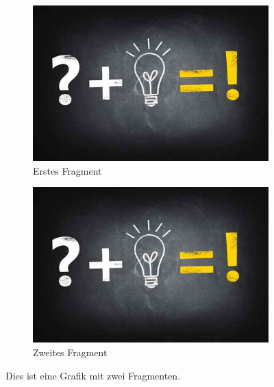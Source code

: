 \begin{figure}[!ht]
	\centering
	\begin{subfigure}{.45\textwidth} %
		\includegraphics[width=\textwidth]{images/test.jpg} %
		\caption{Erstes Fragment}
		\label{spielwiese:fragment1}
	\end{subfigure}
	\hspace{.05\textwidth} %
	\begin{subfigure}{.45\textwidth} %
		\includegraphics[width=\textwidth]{images/test.jpg} %
		\caption{Zweites Fragment}
		\label{spielwiese:fragment2}
	\end{subfigure}
	\caption[Bild mit Fragmenten]{Dies ist eine Grafik mit zwei Fragmenten.}
	\label{spielwiese:fragment}
\end{figure}

